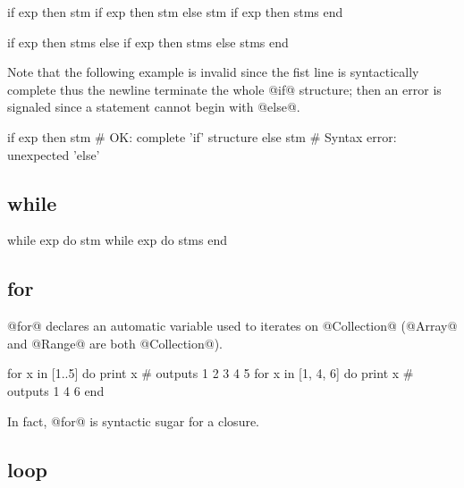 \begin{multicols}{2}
\begin{lst}
if exp then stm
if exp then stm else stm
if exp then
	stms
end
\end{lst}
\columnbreak
\begin{lst}
if exp then
	stms
else if exp then
	stms
else
	stms
end
\end{lst}
\end{multicols}
Note that the following example is invalid since the fist line is syntactically complete thus the newline terminate the whole @if@ structure; then an error is signaled since a statement cannot begin with @else@.
\begin{lst}
if exp then stm # OK: complete 'if' structure
else stm # Syntax error: unexpected 'else'
\end{lst}

\subsection{while}\label{while}

\begin{lst}
while exp do stm
while exp do
	stms
end
\end{lst}

\subsection{for}\label{for}

@for@ declares an automatic variable used to iterates on @Collection@ (@Array@ and @Range@ are both @Collection@).

\begin{lst}
for x in [1..5] do print x # outputs 1 2 3 4 5
for x in [1, 4, 6] do
	print x # outputs 1 4 6
end
\end{lst}

In fact, @for@ is syntactic sugar for a closure.

\subsection{loop}\label{loop}

